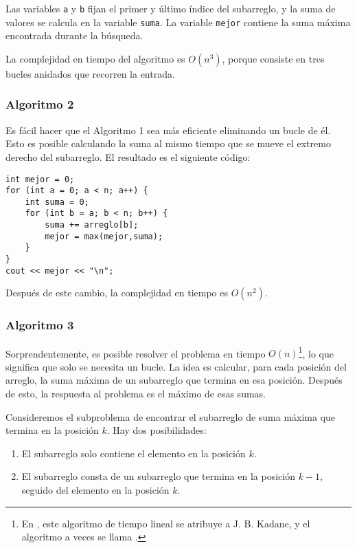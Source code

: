Las variables \texttt{a} y \texttt{b} fijan el primer y
último índice del subarreglo,
y la suma de valores se calcula en la variable \texttt{suma}.
La variable \texttt{mejor} contiene la suma máxima encontrada durante la búsqueda.

La complejidad en tiempo del algoritmo es $O(n^3)$,
porque consiste en tres bucles anidados
que recorren la entrada.

\subsubsection{Algoritmo 2}

Es fácil hacer que el Algoritmo 1 sea más eficiente
eliminando un bucle de él.
Esto es posible calculando la suma al mismo
tiempo que se mueve el extremo derecho del subarreglo.
El resultado es el siguiente código:

\begin{lstlisting}
int mejor = 0;
for (int a = 0; a < n; a++) {
    int suma = 0;
    for (int b = a; b < n; b++) {
        suma += arreglo[b];
        mejor = max(mejor,suma);
    }
}
cout << mejor << "\n";
\end{lstlisting}
Después de este cambio, la complejidad en tiempo es $O(n^2)$.

\subsubsection{Algoritmo 3}

Sorprendentemente, es posible resolver el problema
en tiempo $O(n)$\footnote{En \cite{ben86}, este algoritmo de tiempo lineal
se atribuye a J. B. Kadane, y el algoritmo a veces se
llama  .}, lo que significa
que solo se necesita un bucle.
La idea es calcular, para cada posición del arreglo,
la suma máxima de un subarreglo que termina en esa posición.
Después de esto, la respuesta al problema es el
máximo de esas sumas.

Consideremos el subproblema de encontrar el subarreglo de suma máxima
que termina en la posición $k$.
Hay dos posibilidades:
\begin{enumerate}
\item El subarreglo solo contiene el elemento en la posición $k$.
\item El subarreglo consta de un subarreglo que termina
en la posición $k-1$, seguido del elemento en la posición $k$.
\end{enumerate}


